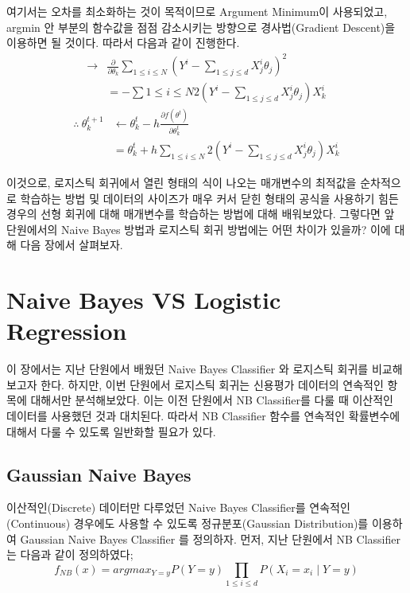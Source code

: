 \documentclass[a4paper]{oblivoir}
\begin{document}
\indent 여기서는 오차를 최소화하는 것이 목적이므로 Argument Minimum이 사용되었고, argmin 안 부분의 함수값을 점점 감소시키는 방향으로 경사법(Gradient Descent)을 이용하면 될 것이다. 따라서 다음과 같이 진행한다.
\begin{align*}
\to &\frac{\partial}{\partial \theta_{k}}\sum_{1 \leq i \leq N}(Y^{i}-\sum_{1 \leq j \leq d}X_{j}^{i}\theta_{j})^{2} \tag{4-63} \\
&= -\sum{1 \leq i \leq N}2(Y^{i}-\sum_{1 \leq j \leq d}X_{j}^{i}\theta_{j})X_{k}^{i} \tag{4-64}
\end{align*}
\begin{align*}
\therefore \: \theta_{k}^{t+1} &\gets \theta_{k}^{t}-h\frac{\partial f(\theta^{t})}{\partial \theta_{k}^{t}} \tag{4-65} \\
&= \theta_{k}^{t}+h\sum_{1 \leq i \leq N}2(Y^{i}-\sum_{1 \leq j \leq d}X_{j}^{i}\theta_{j})X_{k}^{i} \tag{4-66}
\end{align*}

\indent 이것으로, 로지스틱 회귀에서 열린 형태의 식이 나오는 매개변수의 최적값을 순차적으로 학습하는 방법 및 데이터의 사이즈가 매우 커서 닫힌 형태의 공식을 사용하기 힘든 경우의 선형 회귀에 대해 매개변수를 학습하는 방법에 대해 배워보았다. 그렇다면 앞 단원에서의 Naive Bayes 방법과 로지스틱 회귀 방법에는 어떤 차이가 있을까? 이에 대해 다음 장에서 살펴보자.

\section{Naive Bayes VS Logistic Regression}
이 장에서는 지난 단원에서 배웠던 Naive Bayes Classifier 와 로지스틱 회귀를 비교해 보고자 한다. 하지만, 이번 단원에서 로지스틱 회귀는 신용평가 데이터의 연속적인 항목에 대해서만 분석해보았다. 이는 이전 단원에서 NB Classifier를 다룰 때 이산적인 데이터를 사용했던 것과 대치된다. 따라서 NB Classifier 함수를 연속적인 확률변수에 대해서 다룰 수 있도록 일반화할 필요가 있다.

\subsection{Gaussian Naive Bayes}
이산적인(Discrete) 데이터만 다루었던 Naive Bayes Classifier를 연속적인(Continuous) 경우에도 사용할 수 있도록 정규분포(Gaussian Distribution)를 이용하여 Gaussian Naive Bayes Classifier 를 정의하자. 먼저, 지난 단원에서 NB Classifier는 다음과 같이 정의하였다;
\begin{equation}
f_{NB}(x) = argmax_{Y=y}P(Y=y)\prod_{1 \leq i \leq d}P(X_{i} = x_{i} \mid Y=y) \tag{4-67}
\end{equation}
\end{document}
